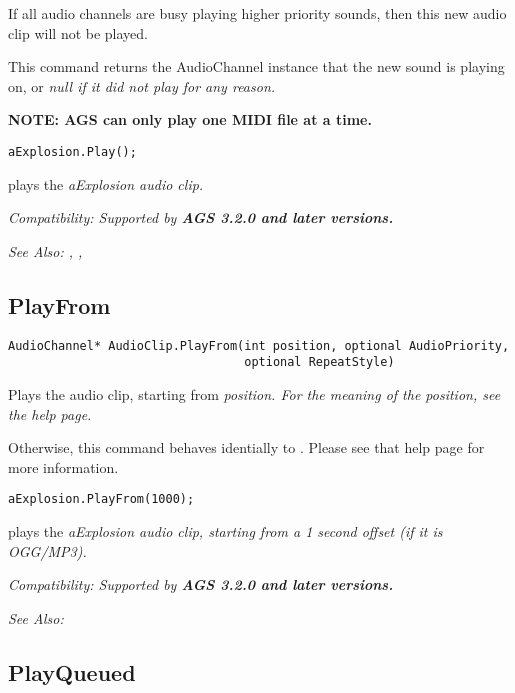If all audio channels are busy playing higher priority sounds, then this new audio clip
will not be played.

This command returns the AudioChannel instance that the new sound is playing on, or
\it{null} if it did not play for any reason.

\bf{NOTE:} AGS can only play one MIDI file at a time.

\begin{verbatim}
aExplosion.Play();
\end{verbatim}
plays the \it{aExplosion} audio clip.

\it{Compatibility:} Supported by \bf{AGS 3.2.0} and later versions.

\it{See Also:} ,
,


\subsection{PlayFrom}\label{AudioClip.PlayFrom}%

\begin{verbatim}
AudioChannel* AudioClip.PlayFrom(int position, optional AudioPriority,
                                 optional RepeatStyle)
\end{verbatim}
Plays the audio clip, starting from \it{position}. For the meaning of the position,
see the  help page.

Otherwise, this command behaves identially to .
Please see that help page for more information.

\begin{verbatim}
aExplosion.PlayFrom(1000);
\end{verbatim}
plays the \it{aExplosion} audio clip, starting from a 1 second offset (if it is OGG/MP3).

\it{Compatibility:} Supported by \bf{AGS 3.2.0} and later versions.

\it{See Also:} 


\subsection{PlayQueued}\label{AudioClip.PlayQueued}%

